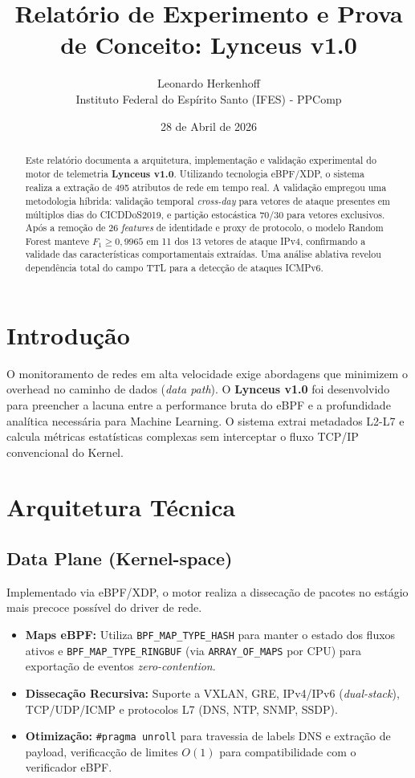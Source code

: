 \documentclass[12pt,a4paper]{article}
\title{Relat\'{o}rio de Experimento e Prova de Conceito: Lynceus v1.0}
\author{Leonardo Herkenhoff \\ \small Instituto Federal do Esp\'{i}rito Santo (IFES) - PPComp}
\date{28 de Abril de 2026}
\begin{document}
\maketitle

\begin{abstract}
Este relat\'{o}rio documenta a arquitetura, implementa\c{c}\~{a}o e valida\c{c}\~{a}o experimental do motor de telemetria \textbf{Lynceus v1.0}. Utilizando tecnologia eBPF/XDP, o sistema realiza a extra\c{c}\~{a}o de 495 atributos de rede em tempo real. A valida\c{c}\~{a}o empregou uma metodologia h\'{i}brida: valida\c{c}\~{a}o temporal \textit{cross-day} para vetores de ataque presentes em m\'{u}ltiplos dias do CICDDoS2019, e parti\c{c}\~{a}o estoc\'{a}stica 70/30 para vetores exclusivos. Ap\'{o}s a remo\c{c}\~{a}o de 26 \textit{features} de identidade e proxy de protocolo, o modelo Random Forest manteve $F_1 \geq 0{,}9965$ em 11 dos 13 vetores de ataque IPv4, confirmando a validade das caracter\'{i}sticas comportamentais extra\'{i}das. Uma an\'{a}lise ablativa revelou depend\^{e}ncia total do campo TTL para a detec\c{c}\~{a}o de ataques ICMPv6.
\end{abstract}

\tableofcontents
\newpage

\section{Introdu\c{c}\~{a}o}
O monitoramento de redes em alta velocidade exige abordagens que minimizem o overhead no caminho de dados (\textit{data path}). O \textbf{Lynceus v1.0} foi desenvolvido para preencher a lacuna entre a performance bruta do eBPF e a profundidade anal\'{i}tica necess\'{a}ria para Machine Learning. O sistema extrai metadados L2-L7 e calcula m\'{e}tricas estat\'{i}sticas complexas sem interceptar o fluxo TCP/IP convencional do Kernel.

\section{Arquitetura T\'{e}cnica}
\subsection{Data Plane (Kernel-space)}
Implementado via eBPF/XDP, o motor realiza a disseca\c{c}\~{a}o de pacotes no est\'{a}gio mais precoce poss\'{i}vel do driver de rede.
\begin{itemize}
    \item \textbf{Maps eBPF:} Utiliza \texttt{BPF\_MAP\_TYPE\_HASH} para manter o estado dos fluxos ativos e \texttt{BPF\_MAP\_TYPE\_RINGBUF} (via \texttt{ARRAY\_OF\_MAPS} por CPU) para exporta\c{c}\~{a}o de eventos \textit{zero-contention}.
    \item \textbf{Disseca\c{c}\~{a}o Recursiva:} Suporte a VXLAN, GRE, IPv4/IPv6 (\textit{dual-stack}), TCP/UDP/ICMP e protocolos L7 (DNS, NTP, SNMP, SSDP).
    \item \textbf{Otimiza\c{c}\~{a}o:} \texttt{\#pragma unroll} para travessia de labels DNS e extra\c{c}\~{a}o de payload, verificac\c{c}\~{a}o de limites $O(1)$ para compatibilidade com o verificador eBPF.
\end{itemize}
\end{document}
